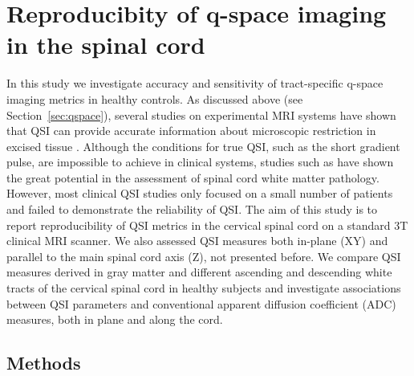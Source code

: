     
\section{Reproducibity of q-space imaging in the spinal cord} 
In this study we investigate accuracy and sensitivity of tract-specific q-space imaging metrics in healthy controls. As discussed above (see Section~\ref{sec:qspace}), several studies on experimental MRI systems have shown that QSI can provide accurate information about microscopic restriction in excised tissue \citep{Assaf:2000,Bar-Shir:2008,Ong:2008}. Although the conditions for true QSI, such as the short gradient pulse, are impossible to achieve in clinical systems, studies such as \citet{Farrell:2008} have shown the great potential in the assessment of spinal cord white matter pathology. However, most clinical QSI studies only focused on a small number of patients and failed to demonstrate the reliability of QSI. The aim of this study is to report reproducibility of QSI metrics in the cervical spinal cord on a standard 3T clinical MRI scanner. We also assessed QSI measures both in-plane (XY) and parallel to the main spinal cord axis (Z), not presented before. We compare QSI measures derived in gray matter and different ascending and descending white tracts of the cervical spinal cord in healthy subjects and investigate associations between QSI parameters and conventional apparent diffusion coefficient (ADC) measures, both in plane and along the cord. 
\subsection*{Methods} 
